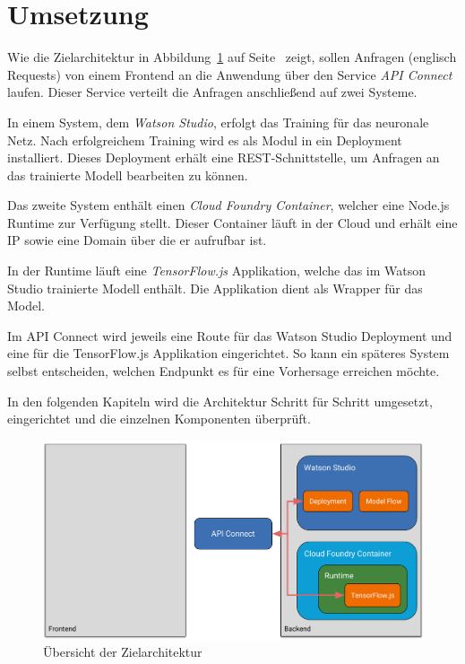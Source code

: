 \section{Umsetzung}
Wie die Zielarchitektur in Abbildung~\ref{fig:umsetzung_zielarchitektur} auf
Seite~\pageref{fig:umsetzung_zielarchitektur} zeigt, sollen Anfragen (englisch Requests) von einem Frontend an die
Anwendung über den Service \textit{API Connect} laufen. Dieser Service verteilt die Anfragen anschließend auf zwei
Systeme.

In einem System, dem \textit{Watson Studio}, erfolgt das Training für das neuronale Netz. Nach erfolgreichem Training
wird es als Modul in ein Deployment installiert. Dieses Deployment erhält eine REST-Schnittstelle, um Anfragen an das
trainierte Modell bearbeiten zu können.

Das zweite System enthält einen \textit{Cloud Foundry Container}, welcher eine Node.js Runtime zur Verfügung stellt.
Dieser Container läuft in der Cloud und erhält eine IP sowie eine Domain über die er aufrufbar ist.

In der Runtime läuft eine \textit{TensorFlow.js} Applikation, welche das im Watson Studio trainierte Modell enthält. Die
Applikation dient als Wrapper für das Model.

Im API Connect wird jeweils eine Route für das Watson Studio Deployment und eine für die TensorFlow.js Applikation
eingerichtet. So kann ein späteres System selbst entscheiden, welchen Endpunkt es für eine Vorhersage erreichen möchte.

In den folgenden Kapiteln wird die Architektur Schritt für Schritt umgesetzt, eingerichtet und die einzelnen Komponenten
überprüft.

\begin{figure}[h]
    \centering
    \includegraphics[width=\textwidth]{images/kapitel_3/architektur_uebersicht.pdf}
    \caption{Übersicht der Zielarchitektur}
    \label{fig:umsetzung_zielarchitektur}
\end{figure}

